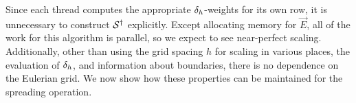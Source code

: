 Since each thread computes the appropriate $\delta_h$-weights for its own row, it is
unnecessary to construct $\mathcal{S}^\dagger$ explicitly. Except allocating memory for $\vec{E}$,
all of the work for this algorithm is parallel, so we expect to see near-perfect scaling.
Additionally, other than using the grid spacing $h$ for scaling in various places, the
evaluation of $\delta_h$, and information about boundaries, there is no dependence on the
Eulerian grid. We now show how these properties can be maintained for the spreading
operation.

